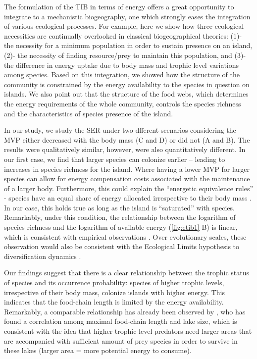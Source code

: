 The formulation of the TIB in terms of energy offers a great opportunity
to integrate to a mechanistic biogeography, one which strongly eases the
integration of various ecological processes. For example, here we show
how three ecological necessities are continually overlooked in classical
biogeographical theories: (1)- the necessity for a minimum population in
order to sustain presence on an island, (2)- the necessity of finding
resource/prey to maintain this population, and (3)- the difference in
energy uptake due to body mass and trophic level variations among
species. Based on this integration, we showed how the structure of the
community is constrained by the energy availability to the species in
question on islands. We also point out that the structure of the food
webs, which determines the energy requirements of the whole community,
controls the species richness and the characteristics of species
presence of the island.

In our study, we study the SER under two dfferent scenarios considering
the MVP either decreased with the body mass (C and D) or did not (A and
B). The results were qualitatively similar, however, were also
quantitatively different. In our first case, we find that larger species
can colonize earlier -- leading to increases in species richness for the
island. Where having a lower MVP for larger species can allow for energy
compensation costs associated with the maintenance of a larger body.
Furthermore, this could explain the ``energetic equivalence rules''
\citep{Nee1991} - species have an equal share of energy allocated
irrespective to their body mass \citep{Brown2003, Damuth2007}. In our
case, this holds true as long as the island is ``saturated'' with
species. Remarkably, under this condition, the relationship between the
logarithm of species richness and the logarithm of available energy
(\ref{fig:etib1} B) is linear, which is consistent with empirical
observations \citep[see Fig 3. and Fig 4. in][]{Wright1983}. Over
evolutionary scales, these observation would also be consistent with the
Ecological Limits hypothesis to diversification dynamics
\citep{Rabosky2015}.

Our findings suggest that there is a clear relationship between the
trophic status of species and its occurrence probability: species of
higher trophic levels, irrespective of their body mass, colonize islands
with higher energy. This indicates that the food-chain length is limited
by the energy availability. Remarkably, a comparable relationship has
already been observed by \citet{Post2000}, who has found a correlation
among maximal food-chain length and lake size, which is consistent with
the idea that higher trophic level predators need larger areas that are
accompanied with sufficient amount of prey species in order to survive
in these lakes (larger area = more potential energy to consume).

